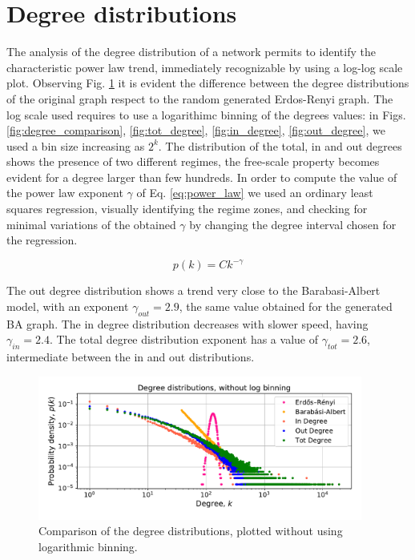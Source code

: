 \documentclass[11pt, twoside]{report}
\begin{document}
    \section{Degree distributions}
    The analysis of the degree distribution of a network permits to identify the characteristic power law trend, immediately recognizable
    by using a log-log scale plot. Observing Fig. \ref{fig:degree_nolog} it is evident the difference between the degree distributions of the original graph respect to the random generated Erdos-Renyi graph.
    The log scale used requires to use a logarithimc binning of the degrees values: in Figs. \ref{fig:degree_comparison}, \ref{fig:tot_degree}, \ref{fig:in_degree}, \ref{fig:out_degree}, we used a bin size increasing as $2^k$.
    The distribution of the total, in and out degrees shows the presence of two different regimes, the free-scale property becomes evident
    for a degree larger than few hundreds. In order to compute the value of the power law exponent $\gamma$ of Eq. \ref{eq:power_law} we used an ordinary least squares regression, visually identifying the regime zones, and checking for minimal variations of the obtained $\gamma$ by changing the degree interval chosen for the regression.

    \begin{equation}
      p(k) = C k^{-\gamma}
      \label{eq:power_law}
    \end{equation}

    The out degree distribution shows a trend very close to the Barabasi-Albert model, with an exponent $\gamma_{out} = 2.9$, the same value obtained for the generated BA graph. The in degree distribution decreases with slower speed, having $\gamma_{in} = 2.4$. The total degree distribution exponent has a value of $\gamma_{tot} = 2.6$, intermediate between the in and out distributions.
 

 \begin{figure}[hb]
      \centering
      \includegraphics[width=0.95\textwidth]{../../scripts/network_analysis/imgs/degree_distributions_nobinlog.pdf}            
      \caption{Comparison of the degree distributions, plotted without using logarithmic binning.}
      \label{fig:degree_nolog}
    \end{figure}
\end{document}
